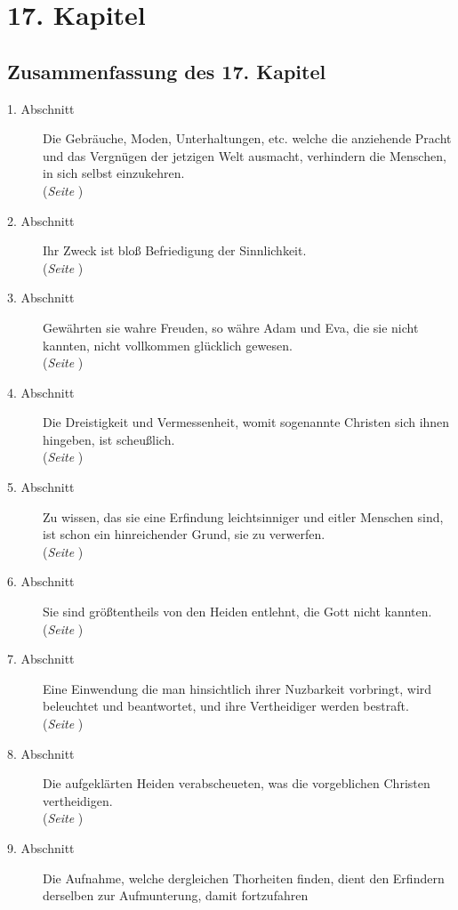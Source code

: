 
\chapter{17. Kapitel} \label{kap17}
\section{Zusammenfassung des 17. Kapitel}

\begin{description}
\item[1. Abschnitt] Die Gebräuche, Moden, Unterhaltungen, etc. welche die
anziehende Pracht und das Vergnügen der jetzigen Welt ausmacht, verhindern die
Menschen, in sich selbst einzukehren.
\\(\textit{Seite \pageref{kap17_ab1}})
\item[2. Abschnitt] Ihr Zweck ist bloß Befriedigung der Sinnlichkeit.
\\(\textit{Seite \pageref{kap17_ab2}})
\item[3. Abschnitt] Gewährten sie wahre Freuden, so währe Adam und Eva, die sie
nicht kannten, nicht vollkommen glücklich gewesen.
\\(\textit{Seite \pageref{kap17_ab3}})
\item[4. Abschnitt] Die Dreistigkeit und Vermessenheit, womit sogenannte
Christen sich ihnen hingeben, ist scheußlich.
\\(\textit{Seite \pageref{kap17_ab4}})
\item[5. Abschnitt] Zu wissen, das sie eine Erfindung leichtsinniger und eitler
Menschen sind, ist schon ein hinreichender Grund, sie zu verwerfen.
\\(\textit{Seite \pageref{kap17_ab5}})
\item[6. Abschnitt] Sie sind größtentheils von den Heiden entlehnt, die Gott
nicht kannten.
\\(\textit{Seite \pageref{kap17_ab6}})
\item[7. Abschnitt] Eine Einwendung die man hinsichtlich ihrer Nuzbarkeit
vorbringt, wird beleuchtet und beantwortet, und ihre Vertheidiger werden
bestraft.
\\(\textit{Seite \pageref{kap17_ab7}})
\item[8. Abschnitt] Die aufgeklärten Heiden verabscheueten, was die vorgeblichen
Christen vertheidigen.
\\(\textit{Seite \pageref{kap17_ab8}})
\item[9. Abschnitt] Die Aufnahme, welche dergleichen Thorheiten finden, dient
den Erfindern derselben zur Aufmunterung, damit fortzufahren

\end{description}
